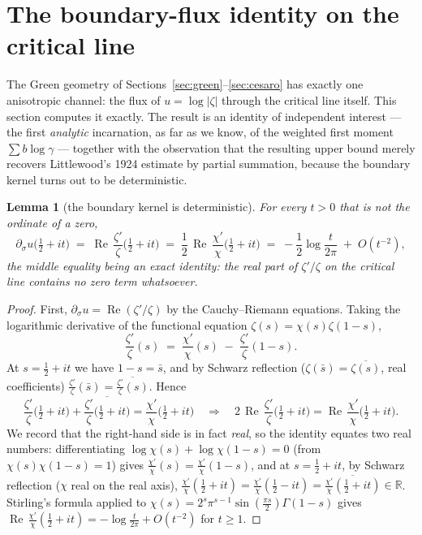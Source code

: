\documentclass[11pt]{amsart}
\theoremstyle{plain}
\newtheorem{lemma}[theorem]{Lemma}
\theoremstyle{definition}
\theoremstyle{remark}
\renewcommand{\Re}{\operatorname{Re}}
\begin{document}
\section{The boundary-flux identity on the critical line}\label{sec:flux}

The Green geometry of Sections~\ref{sec:green}--\ref{sec:cesaro} has exactly one anisotropic channel: the flux of $u=\log|\zeta|$ through the critical line itself. This section computes it exactly. The result is an identity of independent interest --- the first \emph{analytic} incarnation, as far as we know, of the weighted first moment $\sum b\log\gamma$ --- together with the observation that the resulting upper bound merely recovers Littlewood's 1924 estimate by partial summation, because the boundary kernel turns out to be deterministic.

\begin{lemma}[the boundary kernel is deterministic]\label{lem:kernel}
For every $t>0$ that is not the ordinate of a zero,
\[
\partial_\sigma u\bigl(\tfrac12+it\bigr)
\;=\;\Re\,\frac{\zeta'}{\zeta}\bigl(\tfrac12+it\bigr)
\;=\;\frac12\,\Re\,\frac{\chi'}{\chi}\bigl(\tfrac12+it\bigr)
\;=\;-\frac12\log\frac{t}{2\pi}\;+\;O(t^{-2}),
\]
the middle equality being an exact identity: \emph{the real part of $\zeta'/\zeta$ on the critical line contains no zero term whatsoever}.
\end{lemma}

\begin{proof}
First, $\partial_\sigma u=\Re(\zeta'/\zeta)$ by the Cauchy--Riemann equations. Taking the logarithmic derivative of the functional equation $\zeta(s)=\chi(s)\zeta(1-s)$,
\[
\frac{\zeta'}{\zeta}(s)\;=\;\frac{\chi'}{\chi}(s)\;-\;\frac{\zeta'}{\zeta}(1-s).
\]
At $s=\tfrac12+it$ we have $1-s=\bar s$, and by Schwarz reflection ($\zeta(\bar s)=\overline{\zeta(s)}$, real coefficients) $\frac{\zeta'}{\zeta}(\bar s)=\overline{\frac{\zeta'}{\zeta}(s)}$. Hence
\[
\frac{\zeta'}{\zeta}\bigl(\tfrac12+it\bigr)+\overline{\frac{\zeta'}{\zeta}\bigl(\tfrac12+it\bigr)}=\frac{\chi'}{\chi}\bigl(\tfrac12+it\bigr)
\quad\Longrightarrow\quad
2\,\Re\,\frac{\zeta'}{\zeta}\bigl(\tfrac12+it\bigr)=\Re\,\frac{\chi'}{\chi}\bigl(\tfrac12+it\bigr).
\]
We record that the right-hand side is in fact \emph{real}, so the identity equates two real numbers: differentiating $\log\chi(s)+\log\chi(1-s)=0$ (from $\chi(s)\chi(1-s)=1$) gives $\frac{\chi'}{\chi}(s)=\frac{\chi'}{\chi}(1-s)$, and at $s=\tfrac12+it$, by Schwarz reflection ($\chi$ real on the real axis), $\frac{\chi'}{\chi}(\tfrac12+it)=\frac{\chi'}{\chi}(\tfrac12-it)=\overline{\frac{\chi'}{\chi}(\tfrac12+it)}\in\mathbb R$. Stirling's formula applied to $\chi(s)=2^s\pi^{s-1}\sin(\tfrac{\pi s}2)\Gamma(1-s)$ \cite[\S4.12]{Titchmarsh1986} gives $\Re\,\frac{\chi'}{\chi}(\tfrac12+it)=-\log\frac{t}{2\pi}+O(t^{-2})$ for $t\ge1$.
\end{proof}
\end{document}
